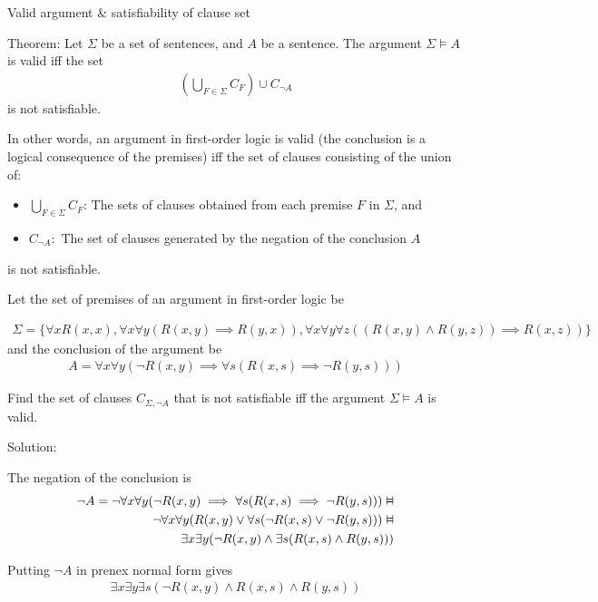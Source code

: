 \documentclass{article}
\newcommand{\vDashv}{%
  \mathrel{%
    \text{%
      \ooalign{$\vDash$\cr\reflectbox{$\vDash$}\cr}%
    }%
  }%
}
\begin{document}
Valid argument \& satisfiability of clause set

Theorem: Let $\Sigma$ be a set of sentences, and $A$ be a sentence. The argument $\Sigma \vDash A$ is valid iff the set 
\begin{align*}
\left( \bigcup_{F \in \Sigma} C_F \right) \cup C_{\neg A}
\end{align*}
is not satisfiable.

In other words, an argument in first-order logic is valid (the conclusion is a logical consequence of the premises) iff the set of clauses consisting of the union of:
\begin{itemize}
    \item $\bigcup_{F \in \Sigma} C_F$: The sets of clauses obtained from each premise $F$ in $\Sigma$, and
    \item $C_{\neg A}:$ The set of clauses generated by the negation of the conclusion $A$
\end{itemize}
is not satisfiable.

Let the set of premises of an argument in first-order logic be

\begin{align*}
\Sigma = \{\forall x R(x,x), \forall x \forall y(R(x,y) \implies R(y,x)), \forall x \forall y \forall z ((R(x,y) \wedge R(y,z)) \implies R(x,z)) \}
\end{align*}
and the conclusion of the argument be 
\begin{align*}
A = \forall x \forall y (\neg R(x,y) \implies \forall s (R(x,s) \implies \neg R(y,s)))
\end{align*}

Find the set of clauses $C_{\Sigma, \neg A}$ that is not satisfiable iff the argument $\Sigma \vDash A$ is valid.

Solution: 

The negation of the conclusion is 
\begin{align*}
\neg A = \neg \forall x \forall y (\neg R(x,y) \implies \forall s(R(x,s) \implies \neg R(y,s))) \vDashv \\
\neg \forall x \forall y (R(x,y) \vee \forall s(\neg R(x,s) \vee \neg R(y,s))) \vDashv \\
\exists x \exists y (\neg R(x,y) \wedge \exists s (R(x,s) \wedge R(y,s)))
\end{align*}

Putting $\neg A$ in prenex normal form gives
\begin{align*}
\exists x \exists y \exists s (\neg R(x,y) \wedge R(x,s) \wedge R(y,s))
\end{align*}
\end{document}
